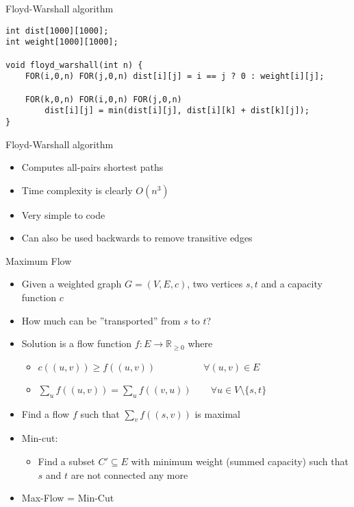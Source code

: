 \documentclass[12pt,t]{beamer}
\newcommand{\bi}{\begin{itemize}}
\newcommand{\ei}{\end{itemize}}
\begin{document}
\begin{frame}[fragile]{Floyd-Warshall algorithm}
    \begin{verbatim}
int dist[1000][1000];
int weight[1000][1000];

void floyd_warshall(int n) {
    FOR(i,0,n) FOR(j,0,n) dist[i][j] = i == j ? 0 : weight[i][j];

    FOR(k,0,n) FOR(i,0,n) FOR(j,0,n)
        dist[i][j] = min(dist[i][j], dist[i][k] + dist[k][j]);
}
    \end{verbatim}
\end{frame}

\begin{frame}{Floyd-Warshall algorithm}
    \vspace{40pt}
    \bi
\item Computes all-pairs shortest paths
\item Time complexity is clearly $O(n^3)$
\item Very simple to code
    \vspace{10pt}
\item Can also be used backwards to remove transitive edges
    \ei
\end{frame}

\begin{frame}{Maximum Flow}
    \bi
\item Given a weighted graph $G = (V,E,c)$, two vertices $s,t$ and a capacity function $c$
\item How much can be ''transported'' from $s$ to $t$?
\item Solution is a flow function $f : E \rightarrow \mathbb R_{\geq 0}$ where
  \bi
    \item $c((u,v)) \geq f((u,v)) \quad \quad\quad\quad \quad \forall (u,v) \in E$
    \item $\sum_uf((u,v)) = \sum_uf((v,u)) \quad \quad \forall u \in V \setminus\{s,t\}$
  \ei
  \item Find a flow $f$ such that $\sum_v f((s,v))$ is maximal
  \vspace{10pt} \pause
  \item Min-cut:
  \bi
    \item Find a subset $C'\subseteq E$ with minimum weight (summed capacity) such that $s$ and $t$ are not connected any more
  \ei
  \vspace{10pt} \pause
  \item Max-Flow = Min-Cut
    \ei
\end{frame}
\end{document}
